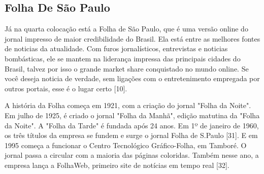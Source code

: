 \documentclass[a4paper]{article}
\begin{document}
\begin{titlepage}
\subsection{Folha De São Paulo}

Já na quarta colocação está a Folha de São Paulo, que é uma versão online do jornal impresso de maior credibilidade do Brasil. Ela está entre as melhores fontes de noticias da atualidade. Com furos jornalísticos, entrevistas e noticias bombásticas, ele se mantem na liderança impressa das principais cidades do Brasil, talvez por isso o grande market share conquistado no mundo online. Se você deseja noticia de verdade, sem ligações com o entretenimento empregada por outros portais, esse é o lugar certo [10].

A história da Folha começa em 1921, com a criação do jornal "Folha da Noite". Em julho de 1925, é criado o jornal "Folha da Manhã", edição matutina da "Folha da Noite". A "Folha da Tarde" é fundada após 24 anos. Em 1º de janeiro de 1960, os três títulos da empresa se fundem e surge o jornal Folha de S.Paulo [31]. E em 1995 começa a funcionar o Centro Tecnológico Gráfico-Folha, em Tamboré. O jornal passa a circular com a maioria das páginas coloridas. Também nesse ano, a empresa lança a FolhaWeb, primeiro site de notícias em tempo real [32].


\end{titlepage}
\end{document}
